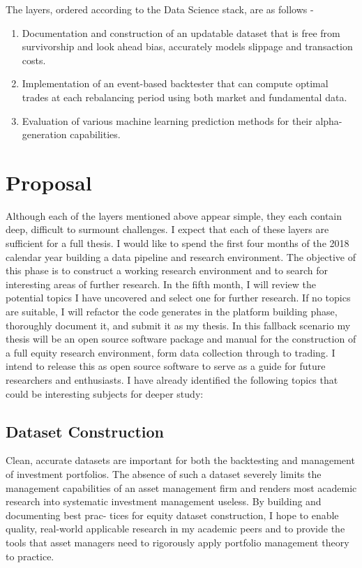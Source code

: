\documentclass[11pt,preprint, authoryear]{elsarticle}
\numberwithin{equation}{section}
\numberwithin{figure}{section}
\numberwithin{table}{section}
\def\tightlist{} %
\begin{document}
The layers, ordered according to the Data Science stack, are as follows
-

\begin{enumerate}
\def\labelenumi{\arabic{enumi}.}
\tightlist
\item
  Documentation and construction of an updatable dataset that is free
  from survivorship and look ahead bias, accurately models slippage and
  transaction costs.
\item
  Implementation of an event-based backtester that can compute optimal
  trades at each rebalancing period using both market and fundamental
  data.
\item
  Evaluation of various machine learning prediction methods for their
  alpha-generation capabilities.
\end{enumerate}

\section{Proposal}\label{proposal}

Although each of the layers mentioned above appear simple, they each
contain deep, difficult to surmount challenges. I expect that each of
these layers are sufficient for a full thesis. I would like to spend the
first four months of the 2018 calendar year building a data pipeline and
research environment. The objective of this phase is to construct a
working research environment and to search for interesting areas of
further research. In the fifth month, I will review the potential topics
I have uncovered and select one for further research. If no topics are
suitable, I will refactor the code generates in the platform building
phase, thoroughly document it, and submit it as my thesis. In this
fallback scenario my thesis will be an open source software package and
manual for the construction of a full equity research environment, form
data collection through to trading. I intend to release this as open
source software to serve as a guide for future researchers and
enthusiasts. I have already identified the following topics that could
be interesting subjects for deeper study:

\subsection{Dataset Construction}\label{dataset-construction}

Clean, accurate datasets are important for both the backtesting and
management of investment portfolios. The absence of such a dataset
severely limits the management capabilities of an asset management firm
and renders most academic research into systematic investment management
useless. By building and documenting best prac- tices for equity dataset
construction, I hope to enable quality, real-world applicable research
in my academic peers and to provide the tools that asset managers need
to rigorously apply portfolio management theory to practice.
\end{document}

